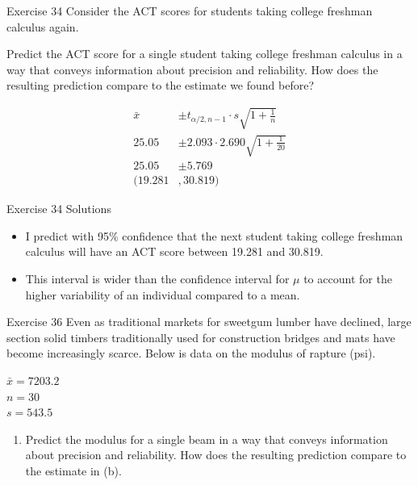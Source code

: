 \documentclass[
  ignorenonframetext,
]{beamer}
\providecommand{\tightlist}{%
  \setlength{\itemsep}{0pt}\setlength{\parskip}{0pt}}\usepackage{longtable,booktabs,array}
\begin{document}
\begin{frame}{Exercise 34}
\protect\hypertarget{exercise-34-3}{}
Consider the ACT scores for students taking college freshman calculus
again.

Predict the ACT score for a single student taking college freshman
calculus in a way that conveys information about precision and
reliability. How does the resulting prediction compare to the estimate
we found before?

\[
\begin{aligned}
\bar{x} &\pm t_{\alpha/2,n-1}\cdot s\sqrt{1 + \frac{1}{n}} \\
25.05 &\pm 2.093 \cdot 2.690\sqrt{1 + \frac{1}{20}} \\
25.05 &\pm 5.769\\
(19.281&, 30.819)
\end{aligned}
\]
\end{frame}

\begin{frame}{Exercise 34 Solutions}
\protect\hypertarget{exercise-34-solutions}{}
\begin{itemize}[<+->]
\tightlist
\item
  I predict with 95\% confidence that the next student taking college
  freshman calculus will have an ACT score between 19.281 and 30.819.
\item
  This interval is wider than the confidence interval for \(\mu\) to
  account for the higher variability of an individual compared to a
  mean.
\end{itemize}
\end{frame}

\begin{frame}{Exercise 36}
\protect\hypertarget{exercise-36-1}{}
Even as traditional markets for sweetgum lumber have declined, large
section solid timbers traditionally used for construction bridges and
mats have become increasingly scarce. Below is data on the modulus of
rapture (psi).

\(\bar{x} = 7203.2\)\\
\(n = 30\)\\
\(s = 543.5\)

\begin{enumerate}[<+->]
[a.]
\setcounter{enumi}{2}
\tightlist
\item
  Predict the modulus for a single beam in a way that conveys
  information about precision and reliability. How does the resulting
  prediction compare to the estimate in (b).
\end{enumerate}
\end{frame}
\end{document}

